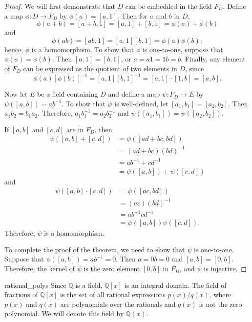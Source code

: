 \begin{proof}
We will first demonstrate that $D$ can be embedded in the field 
$F_D$.  Define a map $\phi : D \rightarrow F_D$ by $\phi(a) 
= [a, 1]$.  Then for $a$ and $b$ in $D$,
\[
\phi( a + b ) = [a+b, 1] = [a, 1] + [b, 1] = \phi(a ) + \phi(b)
\]							       
and
\[
\phi( a b ) = [a b, 1] = [a, 1]  [b, 1] = \phi(a ) \phi(b);
\]
hence, $\phi$ is a homomorphism.  To show that $\phi$ is one-to-one,
suppose that $\phi(a) = \phi( b)$.  Then $[a, 1] = [b, 1]$, or $a = a1
= 1b = b$. Finally, any element of $F_D$ can be expressed as the quotient
of two elements in $D$, since   
\[
\phi(a) [\phi(b)]^{-1} = [a, 1] [b, 1]^{-1} = [a, 1] \cdot [1, b]
= [a, b].
\]


 
Now let $E$ be a field containing $D$ and define a map $\psi :F_D
\rightarrow E$ by $\psi([a, b]) = a b^{-1}$.  To show that $\psi$ is
well-defined, let $[a_1, b_1] = [a_2, b_2]$. Then $a_1 b_2 = b_1 a_2$.
Therefore, $a_1 b_1^{-1} = a_2 b_2^{-1}$  and $\psi( [a_1, b_1]) =
\psi( [a_2, b_2])$.
 

If $[a, b ]$ and $[c, d]$ are in $F_D$, then
\begin{align*}
\psi( [a, b] + [c, d] ) 
& = \psi( [ad + b c, b d ] ) \\
& =  (ad +b c)(b d)^{-1} \\
& = a b^{-1} + c d^{-1} \\
& = \psi( [a, b] ) + \psi( [c, d] )
\end{align*}
and
\begin{align*}
\psi( [a, b] \cdot [c, d] ) & = \psi( [ac, b d ] )\\
 & =  (ac)(b d)^{-1}\\
& = a b^{-1}  c d^{-1}\\
 & = \psi( [a, b] )  \psi( [c, d] ).
\end{align*}
Therefore, $\psi$ is a homomorphism.
 

To complete the proof of the theorem, we need to show that $\psi$ is
one-to-one.  Suppose that $\psi( [a, b] ) = ab^{-1} = 0$. Then $a =
0b = 0$ and $[a, b] = [0, b]$.  Therefore, the kernel of $\psi$ is
the zero element $[ 0, b]$ in $F_D$, and $\psi$ is injective.
\mbox{\hspace{1in}}
\end{proof}
 

\begin{example}{rational_polys}
Since ${\mathbb Q}$ is a field, ${\mathbb Q}[x]$ is an integral domain. The
field of fractions of ${\mathbb Q}[x]$ is the set of all rational
expressions $p(x)/q(x)$, where $p(x)$ and $q(x)$ are polynomials over
the rationals and $q(x)$ is not the zero polynomial. We will denote 
this field by ${\mathbb Q}(x)$.\label{noteratpoly} 
\end{example}

